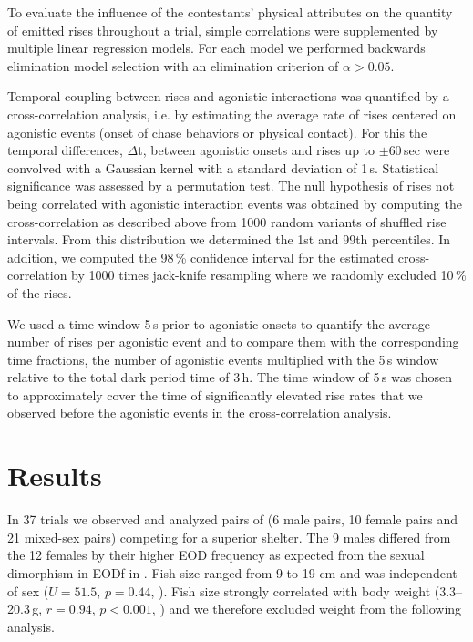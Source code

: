 To evaluate the influence of the contestants' physical attributes on the quantity of emitted rises throughout a trial, simple correlations were supplemented by multiple linear regression models. For each model we performed backwards elimination model selection with an elimination criterion of $\alpha > 0.05$.

Temporal coupling between rises and agonistic interactions was quantified by a cross-correlation analysis, i.e. by estimating the average rate of rises centered on agonistic events (onset of chase behaviors or physical contact). For this the temporal differences, $\Delta$t, between agonistic onsets and rises up to $\pm 60$\,sec were convolved with a Gaussian kernel with a standard deviation of 1\,s. Statistical significance was assessed by a permutation test. The null hypothesis of rises not being correlated with agonistic interaction events was obtained by computing the cross-correlation as described above from 1000 random variants of shuffled rise intervals. From this distribution we determined the 1st and 99th percentiles. In addition, we computed the 98\,\% confidence interval for the estimated cross-correlation by 1000 times jack-knife resampling where we randomly excluded 10\,\% of the rises.

We used a time window 5\,s prior to agonistic onsets to quantify the average number of rises per agonistic event and to compare them with the corresponding time fractions, the number of agonistic events multiplied with the 5\,s window relative to the total dark period time of 3\,h. The time window of 5\,s was chosen to approximately cover the time of significantly elevated rise rates that we observed before the agonistic events in the cross-correlation
analysis.

\section{Results}   %
In 37 trials we observed and analyzed pairs of \lepto{} (6 male pairs, 10 female pairs and 21 mixed-sex pairs) competing for a superior shelter. The 9 males differed from the 12 females by their higher EOD frequency as expected from the sexual dimorphism in EODf in \lepto{}. Fish size ranged from 9 to 19 cm and was independent of sex ($U=51.5$, $p=0.44$, ). Fish size strongly correlated with body weight (3.3--20.3\,g, $r=0.94$, $p<0.001$, ) and we therefore excluded weight from the following analysis.

